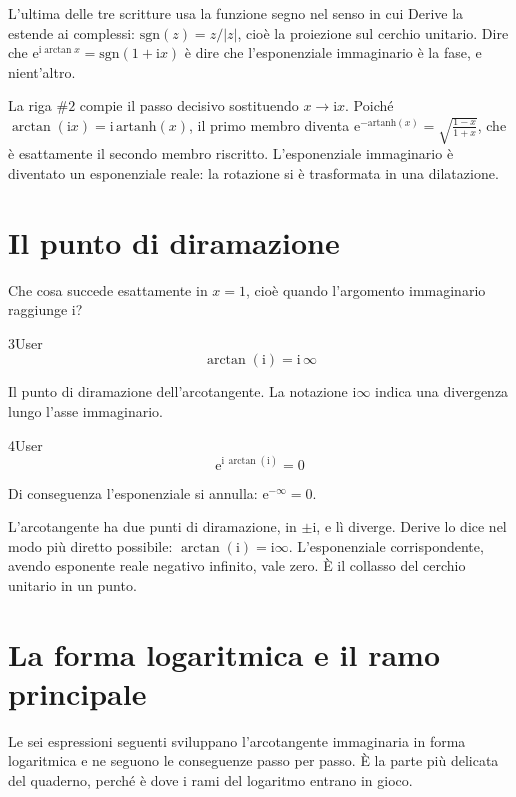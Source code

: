 L'ultima delle tre scritture usa la funzione segno nel senso in cui Derive la estende ai complessi: $\mathrm{sgn}(z)=z/|z|$, cioè la proiezione sul cerchio unitario. Dire che $\mathrm{e}^{\mathrm{i}\arctan x}=\mathrm{sgn}(1+\mathrm{i}x)$ è dire che l'esponenziale immaginario è la fase, e nient'altro.

La riga $\#2$ compie il passo decisivo sostituendo $x\to\mathrm{i}x$. Poiché $\arctan(\mathrm{i}x)=\mathrm{i}\,\mathrm{artanh}(x)$, il primo membro diventa $\mathrm{e}^{-\mathrm{artanh}(x)}=\sqrt{\frac{1-x}{1+x}}$, che è esattamente il secondo membro riscritto. L'esponenziale immaginario è diventato un esponenziale reale: la rotazione si è trasformata in una dilatazione.

\section{Il punto di diramazione}

Che cosa succede esattamente in $x=1$, cioè quando l'argomento immaginario raggiunge $\mathrm{i}$?

\begin{espr}{3}{User}{}
\[
\arctan\!\left(\mathrm{i}\right) = \mathrm{i}\, \infty
\]
\end{espr}
Il punto di diramazione dell'arcotangente. La notazione $\mathrm{i}\infty$ indica una divergenza lungo l'asse immaginario.

\begin{espr}{4}{User}{}
\[
\mathrm{e}^{\mathrm{i}\, \arctan\!\left(\mathrm{i}\right)} = 0
\]
\end{espr}
Di conseguenza l'esponenziale si annulla: $\mathrm{e}^{-\infty}=0$.


L'arcotangente ha due punti di diramazione, in $\pm\mathrm{i}$, e lì diverge. Derive lo dice nel modo più diretto possibile: $\arctan(\mathrm{i})=\mathrm{i}\infty$. L'esponenziale corrispondente, avendo esponente reale negativo infinito, vale zero. È il collasso del cerchio unitario in un punto.

\section{La forma logaritmica e il ramo principale}

Le sei espressioni seguenti sviluppano l'arcotangente immaginaria in forma logaritmica e ne seguono le conseguenze passo per passo. È la parte più delicata del quaderno, perché è dove i rami del logaritmo entrano in gioco.

